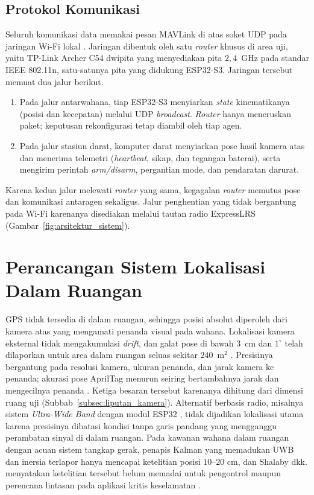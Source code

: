 \documentclass[12pt,a4paper]{report}
\begin{document}
\subsection{Protokol Komunikasi}
Seluruh komunikasi data memakai pesan MAVLink di atas soket UDP pada jaringan Wi-Fi lokal \cite{caoComputationalIntelligenceAlgorithms2024, linLeaderFollowerUAV2026}. Jaringan dibentuk oleh satu \textit{router} khusus di area uji, yaitu TP-Link Archer C54 dwipita yang menyediakan pita $2{,}4$~GHz pada standar IEEE 802.11n, satu-satunya pita yang didukung ESP32-S3. Jaringan tersebut memuat dua jalur berikut.
\begin{enumerate}
    \item Pada jalur antarwahana, tiap ESP32-S3 menyiarkan \textit{state} kinematikanya (posisi dan kecepatan) melalui UDP \textit{broadcast}. \textit{Router} hanya meneruskan paket; keputusan rekonfigurasi tetap diambil oleh tiap agen.
    \item Pada jalur stasiun darat, komputer darat menyiarkan pose hasil kamera atas dan menerima telemetri (\textit{heartbeat}, sikap, dan tegangan baterai), serta mengirim perintah \textit{arm/disarm}, pergantian mode, dan pendaratan darurat.
\end{enumerate}
Karena kedua jalur melewati \textit{router} yang sama, kegagalan \textit{router} memutus pose dan komunikasi antaragen sekaligus. Jalur penghentian yang tidak bergantung pada Wi-Fi karenanya disediakan melalui tautan radio ExpressLRS (Gambar~\ref{fig:arsitektur_sistem}).

\section{Perancangan Sistem Lokalisasi Dalam Ruangan}
\label{sec:lokalisasi_rancangan}

GPS tidak tersedia di dalam ruangan, sehingga posisi absolut diperoleh dari kamera atas yang mengamati penanda visual pada wahana. Lokalisasi kamera eksternal tidak mengakumulasi \textit{drift}, dan galat pose di bawah $3$~cm dan $1^\circ$ telah dilaporkan untuk area dalam ruangan seluas sekitar $240$~m$^2$ \cite{bultmannExternalCameraBased2023}. Presisinya bergantung pada resolusi kamera, ukuran penanda, dan jarak kamera ke penanda; akurasi pose AprilTag menurun seiring bertambahnya jarak dan mengecilnya penanda \cite{zhangIntegratedFrameworkEnhancing2026}. Ketiga besaran tersebut karenanya dihitung dari dimensi ruang uji (Subbab~\ref{subsec:liputan_kamera}). Alternatif berbasis radio, misalnya sistem \textit{Ultra-Wide Band} dengan modul ESP32 \cite{hoDesignIndoorPositioning2023}, tidak dijadikan lokalisasi utama karena presisinya dibatasi kondisi tanpa garis pandang yang mengganggu perambatan sinyal di dalam ruangan. Pada kawanan wahana dalam ruangan dengan acuan sistem tangkap gerak, penapis Kalman yang memadukan UWB dan inersia terlapor hanya mencapai ketelitian posisi $10$--$20$ cm, dan Shalaby dkk. menyatakan ketelitian tersebut belum memadai untuk pengontrol maupun perencana lintasan pada aplikasi kritis keselamatan \cite{shalabyMILUVMultiUAV2026}.
\end{document}
